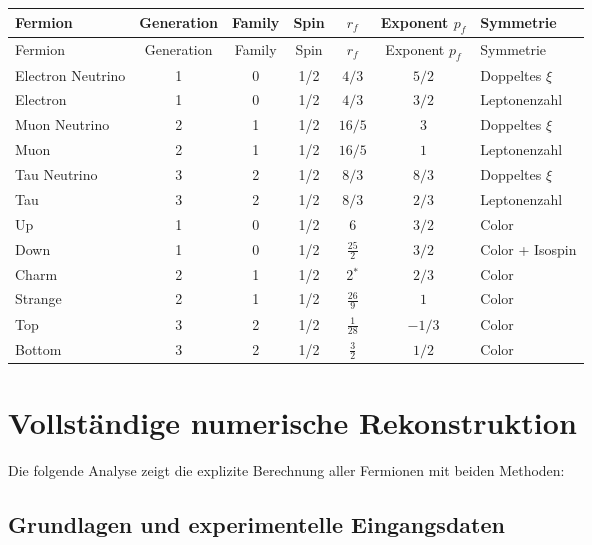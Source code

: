 \documentclass[12pt,a4paper]{article}
\begin{document}
	\begin{longtable}{|l|c|c|c|c|c|l|}
		\hline
		Fermion & Generation & Family & Spin & $r_f$ & Exponent $p_f$ & Symmetrie \\
		\hline
		\endfirsthead
		\hline
		Fermion & Generation & Family & Spin & $r_f$ & Exponent $p_f$ & Symmetrie \\
		\hline
		\endhead
		Electron Neutrino & 1 & 0 & 1/2 & $4/3$ & $5/2$ & Doppeltes $\xi$ \\
		Electron          & 1 & 0 & 1/2 & $4/3$  & $3/2$ & Leptonenzahl \\
		Muon Neutrino     & 2 & 1 & 1/2 & $16/5$ & $3$ & Doppeltes $\xi$ \\
		Muon              & 2 & 1 & 1/2 & $16/5$ & $1$   & Leptonenzahl \\
		Tau Neutrino      & 3 & 2 & 1/2 & $8/3$ & $8/3$ & Doppeltes $\xi$ \\
		Tau               & 3 & 2 & 1/2 & $8/3$  & $2/3$ & Leptonenzahl \\
		\hline
		Up     & 1 & 0 & 1/2 & $6$          & $3/2$ & Color \\
		Down   & 1 & 0 & 1/2 & $\tfrac{25}{2}$ & $3/2$ & Color + Isospin \\
		Charm  & 2 & 1 & 1/2 & $2$$^*$          & $2/3$ & Color \\
		Strange& 2 & 1 & 1/2 & $\tfrac{26}{9}$ & $1$   & Color \\
		Top    & 3 & 2 & 1/2 & $\tfrac{1}{28}$ & $-1/3$ & Color \\
		Bottom & 3 & 2 & 1/2 & $\tfrac{3}{2}$  & $1/2$ & Color \\
		\hline
	\end{longtable}
	
	
	\section{Vollständige numerische Rekonstruktion}
	\label{sec:vollstaendige_rekonstruktion}
	
	Die folgende Analyse zeigt die explizite Berechnung aller Fermionen mit beiden Methoden:
	
	\subsection{Grundlagen und experimentelle Eingangsdaten}
	\label{subsec:grundlagen}
	
\end{document}
